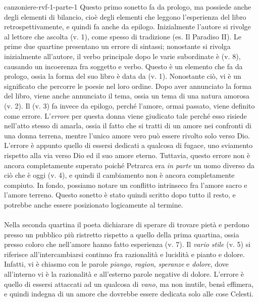 \documentclass[preview]{standalone}
\begin{document}
\begin{snippet}{canzoniere-rvf-1-parte-1}
    Questo primo sonetto fa da prologo, ma possiede anche degli elementi di bilancio,
    cioè degli elementi che leggono l'esperienza del libro retrospettivamente,
    e quindi fa anche da epilogo.
    Inizialmente l'autore si rivolge al lettore che ascolta (v. 1), come spesso di tradizione (es. Il Paradiso II).
    Le prime due quartine presentano un errore di sintassi; nonostante si rivolga inizialmente all'autore,
    il verbo principale dopo le varie subordinate è  (v. 8), causando un incoerenza fra soggetto e verbo.
    Questo è un elemento che fa da prologo, ossia la forma del suo libro è data da  (v. 1).
    Nonostante ciò, vi è un significato che percorre le poesie nel loro ordine.
    Dopo aver annunciato la forma del libro, viene anche annunciato il tema, ossia
    un tema di una natura amorosa (v. 2).
    Il (v. 3) fa invece da epilogo, perché l'amore, ormai passato, viene definito come errore.
    L'\textit{errore} per questa donna viene giudicato tale perché esso risiede nell'atto stesso di amarla,
    ossia il fatto che si tratti di un amore nei confronti di una donna terrena, mentre l'unico amore
    vero può essere rivolto solo verso Dio. L'errore è appunto quello di essersi dedicati a qualcosa di fugace,
    uno sviamento rispetto alla via verso Dio ed il suo amore eterno.
    Tuttavia, questo errore non è ancora completamente superato poiché Petrarca
    era \textit{in parte} un uomo diverso da ciò che è oggi (v. 4), e quindi il cambiamento non è ancora
    completamente compiuto.
    In fondo, possiamo notare un conflitto intrinseco fra l'amore sacro e l'amore terreno.
    Questo sonetto è stato quindi scritto dopo tutto il resto, e potrebbe anche essere posizionato
    logicamente al termine.
    \\\\
    Nella seconda quartina il poeta dichiarare di sperare di trovare pietà e perdono
    presso un pubblico più ristretto rispetto a quello della prima quartina,
    ossia presso coloro che nell'amore hanno fatto esperienza (v. 7).
    Il \textit{vario stile} (v. 5) si riferisce all'intercambiarsi continuo fra
    razionalità e lucidità e pianto e dolore. Infatti, vi è chiasmo con le parole \textit{piango},
    \textit{ragion}, \textit{speranze} e \textit{dolore}, dove all'interno vi è la razionalità e all'esterno
    parole negative di dolore.
    L'errore è quello di essersi attaccati ad un qualcosa di \textit{vano}, ma non inutile, bensì effimera, e quindi
    indegna di un amore che dovrebbe essere dedicata solo alle cose Celesti.

\end{snippet}
\end{document}
